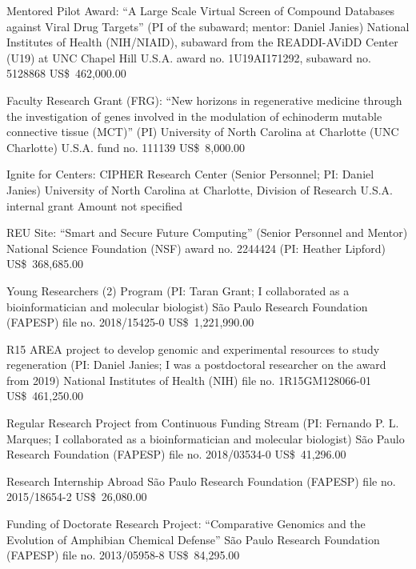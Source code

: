 \documentclass[11pt, letterpaper, sans]{moderncv}
\begin{document}
    {Mentored Pilot Award: ``A Large Scale Virtual Screen of Compound Databases against Viral Drug Targets'' (PI of the subaward; mentor: Daniel Janies)}
    {National Institutes of Health (NIH/NIAID), subaward from the READDI-AViDD Center (U19) at UNC Chapel Hill}
    {U.S.A.}
    {award no. 1U19AI171292, subaward no. 5128868}
    {US\$~462,000.00}{}

    {Faculty Research Grant (FRG): ``New horizons in regenerative medicine through the investigation of genes involved in the modulation of echinoderm mutable connective tissue (MCT)'' (PI)}
    {University of North Carolina at Charlotte (UNC Charlotte)}
    {U.S.A.}
    {fund no. 111139}
    {US\$~8,000.00}

    {Ignite for Centers: CIPHER Research Center (Senior Personnel; PI: Daniel Janies)}
    {University of North Carolina at Charlotte, Division of Research}
    {U.S.A.}
    {internal grant}
    {Amount not specified}{}

    {REU Site: ``Smart and Secure Future Computing'' (Senior Personnel and Mentor)}
    {National Science Foundation (NSF)}
    {award no. 2244424 (PI: Heather Lipford)}
    {US\$~368,685.00}{}

    {Young Researchers (2) Program (PI: Taran Grant; I collaborated as a bioinformatician and molecular biologist)}
    {São Paulo Research Foundation (FAPESP)}
    {file no. 2018/15425-0}
    {US\$~1,221,990.00}{}

    {R15 AREA project to develop genomic and experimental resources to study regeneration (PI: Daniel Janies; I was a postdoctoral researcher on the award from 2019)}
    {National Institutes of Health (NIH)}
    {file no. 1R15GM128066-01}
    {US\$~461,250.00}{}

    {Regular Research Project from Continuous Funding Stream (PI: Fernando P. L. Marques; I collaborated as a bioinformatician and molecular biologist)}
    {São Paulo Research Foundation (FAPESP)}
    {file no. 2018/03534-0}
    {US\$~41,296.00}{}

    {Research Internship Abroad}
    {São Paulo Research Foundation (FAPESP)}
    {file no. 2015/18654-2}
    {US\$~26,080.00}{}

    {Funding of Doctorate Research Project: ``Comparative Genomics and the Evolution of Amphibian Chemical Defense''}
    {São Paulo Research Foundation (FAPESP)}
    {file no. 2013/05958-8}
    {US\$~84,295.00}{}
\end{document}

